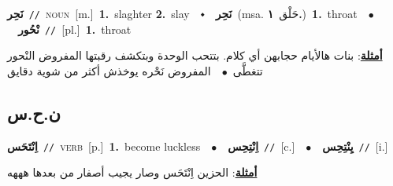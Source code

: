 \documentclass[10pt,a4paper,twoside]{article} %
\begin{document}
\begin{multicols}{2}
{\setlength\topsep{0pt}\textbf{\foreignlanguage{arabic}{نَحِر}}\ {\color{gray}\texttt{//}\color{black}}\ \textsc{noun}\ [m.]\ \textbf{1.}~slaghter  \textbf{2.}~slay\ \ $\smblkdiamond$\ \ \setlength\topsep{0pt}\textbf{\foreignlanguage{arabic}{نَحِر}}\ \color{gray}(msa. \foreignlanguage{arabic}{حَلْق}~\foreignlanguage{arabic}{\textbf{١.}})\color{black}\ \textbf{1.}~throat\ \ $\bullet$\ \ \setlength\topsep{0pt}\textbf{\foreignlanguage{arabic}{نْحُور}}\ {\color{gray}\texttt{//}\color{black}}\ [pl.]\ \textbf{1.}~throat\  \begin{flushright}\color{gray}\foreignlanguage{arabic}{\textbf{\underline{\foreignlanguage{arabic}{أمثلة}}}: بنات هالأيام حجابهن أي كلام. بتتحب الوحدة وبتكشف رقبتها المفروض النْحور تتغطَّى\ $\bullet$\ \  المفروض نَحْره يوخذش أكثر من شوية دقايق}\end{flushright}\color{black}} \vspace{2mm}

\vspace{-3mm}
\subsection*{\color{blue}\foreignlanguage{arabic}{ن.ح.س}\color{blue}{}} 

{\setlength\topsep{0pt}\textbf{\foreignlanguage{arabic}{اِنْتَحَس}}\ {\color{gray}\texttt{//}\color{black}}\ \textsc{verb}\ [p.]\ \textbf{1.}~become luckless\ \ $\bullet$\ \ \setlength\topsep{0pt}\textbf{\foreignlanguage{arabic}{اِنْتِحِس}}\ {\color{gray}\texttt{//}\color{black}}\ [c.]\ \ $\bullet$\ \ \setlength\topsep{0pt}\textbf{\foreignlanguage{arabic}{يِنْتِحِس}}\ {\color{gray}\texttt{//}\color{black}}\ [i.]\  \begin{flushright}\color{gray}\foreignlanguage{arabic}{\textbf{\underline{\foreignlanguage{arabic}{أمثلة}}}: الحزين اِنْتَحَس وصار يجيب أصفار من بعدها هههه}\end{flushright}\color{black}} \vspace{2mm}


\end{multicols}
\end{document}
